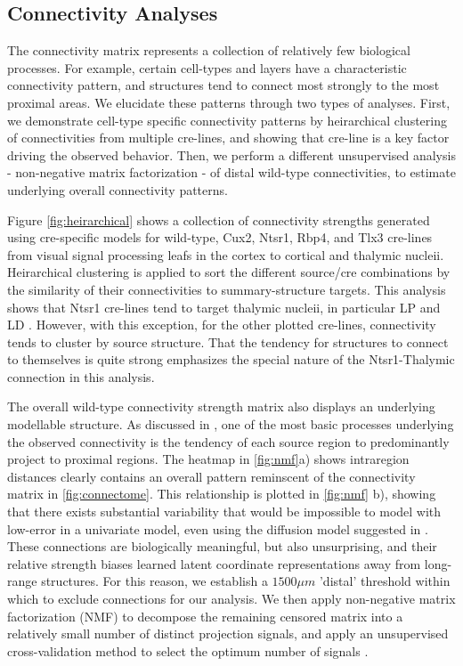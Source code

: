 \subsection{Connectivity Analyses}


The connectivity matrix represents a collection of relatively few biological processes.
For example, certain cell-types and layers have a characteristic connectivity pattern, and structures tend to connect most strongly to the most proximal areas.
We elucidate these patterns through two types of analyses. 
First, we demonstrate cell-type specific connectivity patterns by heirarchical clustering of connectivities from multiple cre-lines, and showing that cre-line is a key factor driving the observed behavior. 
Then, we perform a different unsupervised analysis - non-negative matrix factorization - of distal wild-type connectivities, to estimate underlying overall connectivity patterns.

Figure \ref{fig:heirarchical} shows a collection of connectivity strengths generated using cre-specific models for wild-type, Cux2, Ntsr1, Rbp4, and Tlx3 cre-lines from visual signal processing leafs in the cortex to cortical and thalymic nucleii.
Heirarchical clustering is applied to sort the different source/cre combinations by the similarity of their connectivities to summary-structure targets.
This analysis shows that Ntsr1 cre-lines tend to target thalymic nucleii, in particular LP and LD \citet{Jeong2016-dc}.
However, with this exception, for the other plotted cre-lines, connectivity tends to cluster by source structure.
That the tendency for structures to connect to themselves is quite strong emphasizes the special nature of the Ntsr1-Thalymic connection in this analysis.

The overall wild-type connectivity strength matrix also displays an underlying modellable structure.
As discussed in \citet{Knox2019-ot}, one of the most basic processes underlying the observed connectivity is the tendency of each source region to predominantly project to proximal regions.
The heatmap in \ref{fig:nmf}a) shows intraregion distances clearly contains an overall pattern reminscent of the connectivity matrix in \ref{fig:connectome}.
This relationship is plotted in \ref{fig:nmf} b), showing that there exists substantial variability that would be impossible to model with low-error in a univariate model, even using the diffusion model suggested in \citet{Knox2019-ot}.
These connections are biologically meaningful, but also unsurprising, and their relative strength biases learned latent coordinate representations away from long-range structures.
For this reason, we establish a $1500 \mu m$ 'distal' threshold within which to exclude connections for our analysis.
We then apply non-negative matrix factorization (NMF) to decompose the remaining censored matrix into a relatively small number of distinct projection signals, and apply an unsupervised cross-validation method to select the optimum number of signals .





